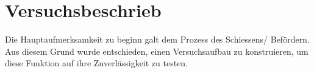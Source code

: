 \section{Versuchsbeschrieb}

Die Hauptaufmerksamkeit zu beginn galt dem Prozess des Schiessens/ Befördern. Aus diesem Grund wurde entschieden, einen Versuchsaufbau zu konstruieren, um diese Funktion auf ihre Zuverlässigkeit zu testen.
